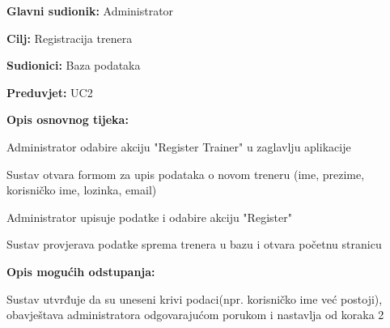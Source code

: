 	   				
	   				\begin{packed_item}
	   					
	   					\item \textbf{Glavni sudionik: }Administrator
	   					\item  \textbf{Cilj:} Registracija trenera
	   					\item  \textbf{Sudionici:} Baza podataka
	   					\item  \textbf{Preduvjet:} UC2
	   					\item  \textbf{Opis osnovnog tijeka:}
	   					
	   					\item[] \begin{packed_enum}
	   						
	   						\item Administrator odabire akciju "Register Trainer" u zaglavlju aplikacije
	   						\item Sustav otvara formom za upis podataka o novom treneru (ime, prezime, korisničko ime, lozinka, email)
	   						\item Administrator upisuje podatke i odabire akciju "Register"
	   						\item Sustav provjerava podatke sprema trenera u bazu i otvara početnu stranicu
	   						
	   						
	   					\end{packed_enum}
	   					
	   					\item  \textbf{Opis mogućih odstupanja:}
	   					
	   					\begin{packed_enum}
	   						
	   						\item[4.a] Sustav utvrđuje da su uneseni krivi podaci(npr. korisničko ime već postoji), obavještava administratora odgovarajućom porukom i nastavlja od koraka 2
	   						
	   					\end{packed_enum}
	   					
	   				\end{packed_item}
   				
   				\noindent {}
   				
